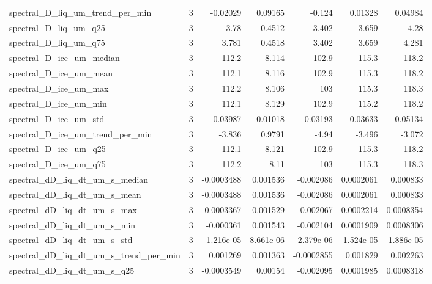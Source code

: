 \begin{table}[htbp]
\begin{tabular}{lrrrrrr}
spectral\_D\_liq\_um\_trend\_per\_min & 3 & -0.02029 & 0.09165 & -0.124 & 0.01328 & 0.04984 \\
spectral\_D\_liq\_um\_q25 & 3 & 3.78 & 0.4512 & 3.402 & 3.659 & 4.28 \\
spectral\_D\_liq\_um\_q75 & 3 & 3.781 & 0.4518 & 3.402 & 3.659 & 4.281 \\
spectral\_D\_ice\_um\_median & 3 & 112.2 & 8.114 & 102.9 & 115.3 & 118.2 \\
spectral\_D\_ice\_um\_mean & 3 & 112.1 & 8.116 & 102.9 & 115.3 & 118.2 \\
spectral\_D\_ice\_um\_max & 3 & 112.2 & 8.106 & 103 & 115.3 & 118.3 \\
spectral\_D\_ice\_um\_min & 3 & 112.1 & 8.129 & 102.9 & 115.2 & 118.2 \\
spectral\_D\_ice\_um\_std & 3 & 0.03987 & 0.01018 & 0.03193 & 0.03633 & 0.05134 \\
spectral\_D\_ice\_um\_trend\_per\_min & 3 & -3.836 & 0.9791 & -4.94 & -3.496 & -3.072 \\
spectral\_D\_ice\_um\_q25 & 3 & 112.1 & 8.121 & 102.9 & 115.3 & 118.2 \\
spectral\_D\_ice\_um\_q75 & 3 & 112.2 & 8.11 & 103 & 115.3 & 118.3 \\
spectral\_dD\_liq\_dt\_um\_s\_median & 3 & -0.0003488 & 0.001536 & -0.002086 & 0.0002061 & 0.000833 \\
spectral\_dD\_liq\_dt\_um\_s\_mean & 3 & -0.0003488 & 0.001536 & -0.002086 & 0.0002061 & 0.000833 \\
spectral\_dD\_liq\_dt\_um\_s\_max & 3 & -0.0003367 & 0.001529 & -0.002067 & 0.0002214 & 0.0008354 \\
spectral\_dD\_liq\_dt\_um\_s\_min & 3 & -0.000361 & 0.001543 & -0.002104 & 0.0001909 & 0.0008306 \\
spectral\_dD\_liq\_dt\_um\_s\_std & 3 & 1.216e-05 & 8.661e-06 & 2.379e-06 & 1.524e-05 & 1.886e-05 \\
spectral\_dD\_liq\_dt\_um\_s\_trend\_per\_min & 3 & 0.001269 & 0.001363 & -0.0002855 & 0.001829 & 0.002263 \\
spectral\_dD\_liq\_dt\_um\_s\_q25 & 3 & -0.0003549 & 0.00154 & -0.002095 & 0.0001985 & 0.0008318 \\
\bottomrule
\end{tabular}

\end{table}
